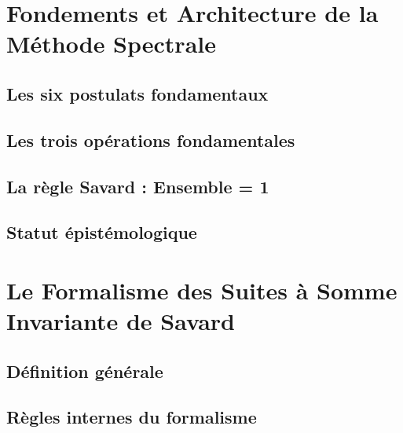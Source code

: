 \documentclass[11pt,a4paper]{article}
\begin{document}
\section{Fondements et Architecture de la Méthode Spectrale}

\subsection{Les six postulats fondamentaux}
\subsection{Les trois opérations fondamentales}
\subsection{La règle Savard : Ensemble = 1}
\subsection{Statut épistémologique}

\section{Le Formalisme des Suites à Somme Invariante de Savard}

\subsection{Définition générale}

\subsection{Règles internes du formalisme}
\label{hol:pos_substitution}
\end{document}
